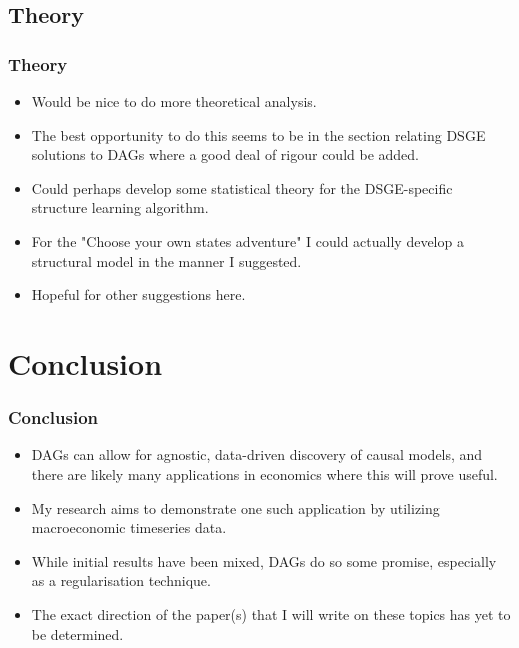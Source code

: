 \documentclass{beamer}
\begin{document}
\subsection{Theory}
\begin{frame}
    \frametitle{Theory}
    \begin{itemize}
        \item Would be nice to do more theoretical analysis.
        \item The best opportunity to do this seems to be in the section relating DSGE solutions to DAGs where a good deal of rigour could be added.
        \item Could perhaps develop some statistical theory for the DSGE-specific structure learning algorithm.
        \item For the "Choose your own states adventure" I could actually develop a structural model in the manner I suggested. 
        \item Hopeful for other suggestions here.
    \end{itemize}
\end{frame}

\section{Conclusion}
\begin{frame}
    \frametitle{Conclusion}
    \begin{itemize}
        \item DAGs can allow for agnostic, data-driven discovery of causal models, and there are likely many applications in economics where this will prove useful.
        \item My research aims to demonstrate one such application by utilizing macroeconomic timeseries data.
        \item While initial results have been mixed, DAGs do so some promise, especially as a regularisation technique.
        \item The exact direction of the paper(s) that I will write on these topics has yet to be determined.
    \end{itemize}
\end{frame}
\end{document}
